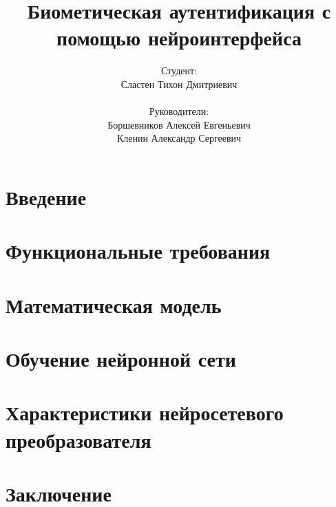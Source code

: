 \documentclass{beamer}
\title{Биометическая аутентификация с помощью нейроинтерфейса}
\author{
    Студент: \\ Сластен Тихон Дмитриевич \\ \\
    Руководители: \\ Боршевников Алексей Евгеньевич \\ Кленин Александр Сергеевич}
\institute{Б8303а Прикладная математика и информатика}
\date{}
\begin{document}
\maketitle

\section{Введение}





\section{Функциональные требования}



\section{Математическая модель}





\section{Обучение нейронной сети}



\section{Характеристики нейросетевого преобразователя}




\section{Заключение}

\end{document}
